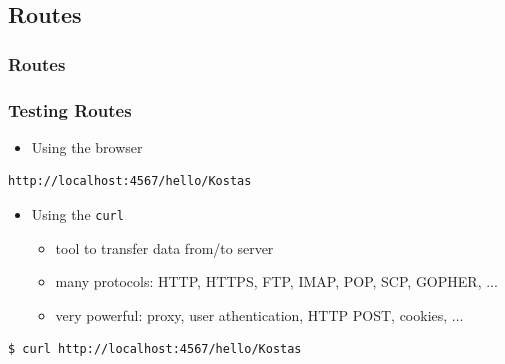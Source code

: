 \documentclass{beamer}
\begin{document}
\subsection{Routes}
\begin{frame}[fragile]\frametitle{Routes}

  

\end{frame}




\begin{frame}[fragile]\frametitle{Testing Routes}

  \begin{itemize}
    \item Using the browser
  \end{itemize}
  
  \begin{lstlisting}[language=bash, escapechar={^}]
http://localhost:4567/hello/Kostas
  \end{lstlisting}

  \begin{itemize}
    \item Using the \texttt{curl}
  \begin{itemize}
    \item tool to transfer data from/to server
    \item many protocols: HTTP, HTTPS, FTP, IMAP, POP, SCP, GOPHER, ...
    \item very powerful: proxy, user athentication, HTTP POST, cookies, ...
  \end{itemize}
  \end{itemize}

  \begin{lstlisting}[language=bash, escapechar={^}]
$ curl http://localhost:4567/hello/Kostas
  \end{lstlisting}

\end{frame}
\end{document}
